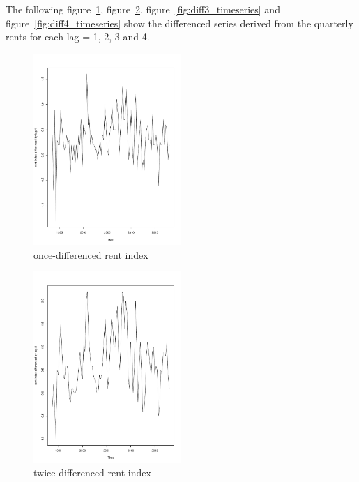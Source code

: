 \documentclass[11pt,a4paper]{article}
\begin{document}
The following figure~\ref{fig:diff1_timeseries}, figure~\ref{fig:diff2_timeseries}, figure~\ref{fig:diff3_timeseries} and figure~\ref{fig:diff4_timeseries} show the differenced series derived from the quarterly rents for each lag = 1, 2, 3 and 4.
\begin{figure}[!htb]
\centering
\includegraphics[angle=0,
width=0.5\textwidth]{diff1_timeseries}
\caption{once-differenced rent index
\label{fig:diff1_timeseries}}
\end{figure}
\begin{figure}[!htb]
\centering
\includegraphics[angle=0,
width=0.5\textwidth]{diff2_timeseries}
\caption{twice-differenced rent index
\label{fig:diff2_timeseries}}
\end{figure}
\end{document}
